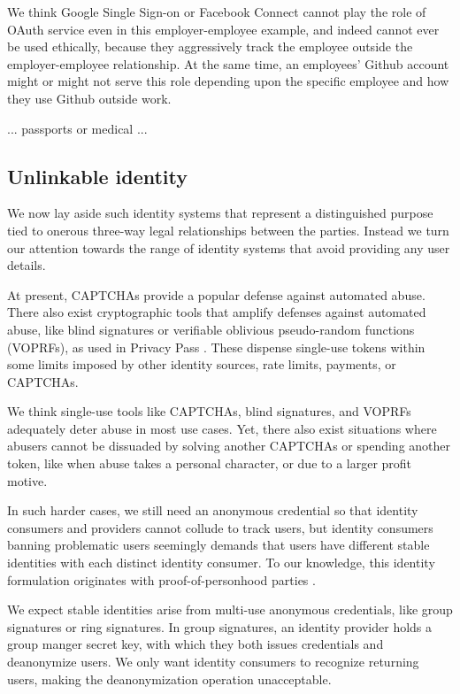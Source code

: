 We think Google Single Sign-on or Facebook Connect cannot play the role of OAuth service even in this employer-employee example, and indeed cannot ever be used ethically, because they aggressively track the employee outside the employer-employee relationship.  At the same time, an employees' Github account might or might not serve this role depending upon the specific employee and how they use Github outside work.  

... passports or medical ...

\subsection{Unlinkable identity}

We now lay aside such identity systems that represent a distinguished purpose tied to onerous three-way legal relationships between the parties.  Instead we turn our attention towards the range of identity systems that avoid providing any user details.  

At present, CAPTCHAs provide a popular defense against automated abuse.  There also exist cryptographic tools that amplify defenses against automated abuse, like blind signatures or verifiable oblivious pseudo-random functions (VOPRFs), as used in Privacy Pass \cite{privacypass}.  These dispense single-use tokens within some limits imposed by other identity sources, rate limits, payments, or CAPTCHAs.  

We think single-use tools like CAPTCHAs, blind signatures, and VOPRFs adequately deter abuse in most use cases.  Yet, there also exist situations where abusers cannot be dissuaded by solving another CAPTCHAs or spending another token, like when abuse takes a personal character, or due to a larger profit motive.  

In such harder cases, we still need an anonymous credential so that identity consumers and providers cannot collude to track users, but identity consumers banning problematic users seemingly demands that users have different stable identities with each distinct identity consumer.  
To our knowledge, this identity formulation originates with proof-of-personhood parties \cite{pop2008,pop2017}.

We expect stable identities arise from multi-use anonymous credentials, like group signatures or ring signatures.  In group signatures, an identity provider holds a group manger secret key, with which they both issues credentials and deanonymize users.  We only want identity consumers to recognize returning users, making the deanonymization operation unacceptable.  


